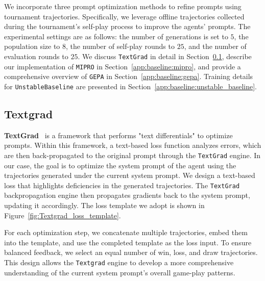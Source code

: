 We incorporate three prompt optimization methods to refine prompts using tournament trajectories. Specifically, we leverage offline trajectories collected during the tournament’s self-play process to improve the agents’ prompts. The experimental settings are as follows: the number of generations is set to $5$, the population size to $8$, the number of self-play rounds to $25$, and the number of evaluation rounds to $25$. 
We discuss \texttt{TextGrad} in detail in Section~\ref{app:baseline:Textgrad}, describe our implementation of \texttt{MIPRO} in Section~\ref{app:baseline:mipro}, and provide a comprehensive overview of \texttt{GEPA} in Section~\ref{app:baseline:gepa}. Training details for \texttt{UnstableBaseline} are presented in Section~\ref{app:baseline:unstable_baseline}.

\subsection{Textgrad}
\label{app:baseline:Textgrad}
\textbf{TextGrad}~\citep{yuksekgonul2024textgrad} is a framework that performs "text differentials" to optimize prompts. Within this framework, a text-based loss function analyzes errors, which are then back-propagated to the original prompt through the \texttt{TextGrad} engine. In our case, the goal is to optimize the system prompt of the agent using the trajectories generated under the current system prompt. We design a text-based loss that highlights deficiencies in the generated trajectories. The \texttt{TextGrad} backpropagation engine then propagates gradients back to the system prompt, updating it accordingly. The loss template we adopt is shown in Figure~\ref{fig:Textgrad_loss_template}. 

For each optimization step, we concatenate multiple trajectories, embed them into the template, and use the completed template as the loss input. To ensure balanced feedback, we select an equal number of win, loss, and draw trajectories. This design allows the \texttt{Textgrad} engine to develop a more comprehensive understanding of the current system prompt’s overall game-play patterns.



